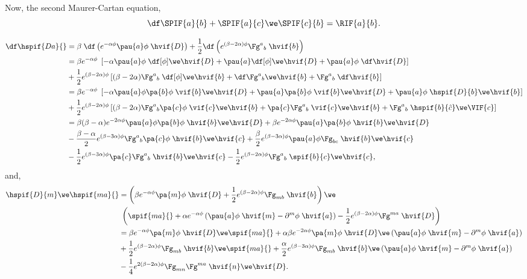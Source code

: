 Now, the second Maurer-Cartan equation,
\begin{equation}
  \df\SPIF{a}{b}+\SPIF{a}{c}\we\SPIF{c}{b}=\RIF{a}{b}.
\end{equation}

\begin{align}
  \df\hspif{D a}{} 
  &= \beta\;\df\left( e^{-\alpha\phi}\pau{a}\phi\;\hvif{D}\right) + \frac{1}{2}\df\left(e^{(\beta-2\alpha)\phi}\Fg^a{}_{b}\;\hvif{b}\right)\nonumber\\
  &= \beta e^{-\alpha\phi}\;\left[-\alpha \pau{a}\phi\;\df[\phi]\we\hvif{D} +\pau{a}\df[\phi]\we\hvif{D} + \pau{a}\phi\;\df\hvif{D}\right]\notag\\
  & + \frac{1}{2}e^{(\beta-2\alpha)\phi}\left[(\beta-2\alpha)\Fg^a{}_{b}\;\df[\phi]\we\hvif{b} + \df \Fg^a{}_{b}\we\hvif{b} + \Fg^a{}_{b}\;\df\hvif{b}\right]\nonumber\\
  &= \beta e^{-\alpha\phi}\;\left[-\alpha \pau{a}\phi\pa{b}\phi\;\vif{b}\we\hvif{D} +\pau{a}\pa{b}\phi\;\vif{b}\we\hvif{D} + \pau{a}\phi\;\hspif{D}{b}\we\hvif{b}\right] \notag\\
  &+ \frac{1}{2}e^{(\beta-2\alpha)\phi}\left[(\beta-2\alpha)\Fg^a{}_b\pa{c}\phi\;\vif{c}\we\hvif{b} + \pa{c} \Fg^a{}_b\;\vif{c}\we\hvif{b} + \Fg^a{}_b\;\hspif{b}{\hat{c}}\we\VIF{c}\right]\nonumber\\
  &= \beta(\beta-\alpha)e^{-2\alpha\phi}\pau{a}\phi\pa{b}\phi\;\hvif{b}\we\hvif{D} + \beta e^{-2\alpha\phi}\pau{a}\pa{b}\phi\;\hvif{b}\we\hvif{D}  \notag\\
  &-\frac{\beta-\alpha}{2}e^{(\beta-3\alpha)\phi}\Fg^a{}_b\pa{c}\phi\;\hvif{b}\we\hvif{c} +\frac{\beta}{2}e^{(\beta-3\alpha)\phi}\pau{a}\phi \Fg_{bc}\;\hvif{b}\we\hvif{c}\nonumber\\
  & -\frac{1}{2}e^{(\beta-3\alpha)\phi}\pa{c} \Fg^a{}_b\;\hvif{b}\we\hvif{c} - \frac{1}{2}e^{(\beta-2\alpha)\phi}\Fg^a{}_b\; \spif{b}{c}\we\hvif{c},
\end{align}
and,
\begin{align}
  \hspif{D}{m}\we\hspif{m a}{} &= \left(\beta e^{-\alpha\phi}\pa{m}\phi\;\hvif{D} + \frac{1}{2}e^{(\beta-2\alpha)\phi}\Fg_{m b}\;\hvif{b}  \right)\we\notag\\
  &{}\;\left(\spif{m a}{} + \alpha e^{-\alpha\phi}\left(\pau{a}\phi\;\hvif{m} - \partial^{m}\phi\;\hvif{a}\right) - \frac{1}{2}e^{(\beta-2\alpha)\phi}\Fg^{m a}\;\hvif{D}  \right)\nonumber\\
  &= \beta e^{-\alpha\phi}\pa{m}\phi\;\hvif{D}\we\spif{m a}{} + \alpha\beta e^{-2\alpha\phi}\pa{m}\phi\;\hvif{D}\we\left(\pau{a}\phi\;\hvif{m} - \partial^{m}\phi\;\hvif{a}\right)\nonumber\\
  & + \frac{1}{2}e^{(\beta-2\alpha)\phi}\Fg_{m b}\;\hvif{b}\we\spif{m a}{} + \frac{\alpha}{2}e^{(\beta-3\alpha)\phi}\Fg_{m b}\;\hvif{b}\we\left(\pau{a}\phi\;\hvif{m} - \partial^{m}\phi\;\hvif{a}\right)\nonumber\\
  & -\frac{1}{4}e^{2(\beta-2\alpha)\phi}\Fg_{m n}\Fg^{m a}\;\hvif{n}\we\hvif{D}.
\end{align}
